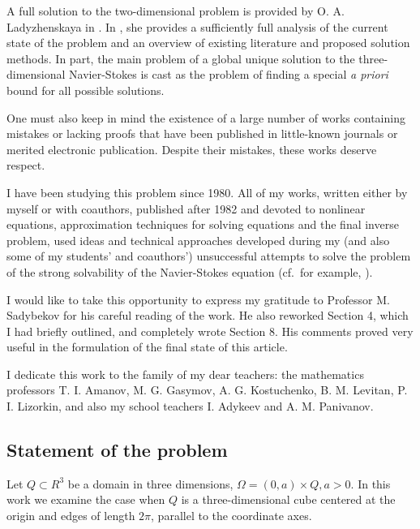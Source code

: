 \documentclass{article}
\numberwithin{equation}{section}
\begin{document}
A full solution to the two-dimensional problem is provided by O. A.
Ladyzhenskaya in \cite{lad1}. In \cite{lad4}, she provides a sufficiently full
analysis of the current state of the problem and an overview of existing
literature and proposed solution methods. In part, the main problem of a
global unique solution to the three-dimensional Navier-Stokes is cast as the
problem of finding a special \emph{a priori} bound for all possible solutions.

One must also keep in mind the existence of a large number of works containing
mistakes or lacking proofs that have been published in little-known journals
or merited electronic publication. Despite their  mistakes, these works
deserve respect.

I have been studying this problem since 1980. All of my works, written
either by myself or with coauthors, published after 1982 and devoted to
nonlinear equations, approximation techniques for solving equations and the
final inverse problem, used ideas and technical approaches developed during my
(and also some of my students' and coauthors') unsuccessful attempts to solve
the problem of the strong solvability of the Navier-Stokes equation (cf.\ for
example, 
\cite{ote1,ote2,ote3,ote4,ote5,ote6,ote7,ote8,ote9,ote10,ote11,ote12,ote13,ote14,ote15,ote16,ote17,ote18,ote19,ote20,ote21,ote22}).

I would like to take this opportunity to express my gratitude to Professor M.
Sadybekov for his careful reading of the work. He also reworked 
Section 4, which I had briefly outlined, and completely wrote Section 8. His
comments proved very useful in the formulation of the final state of this
article.

I dedicate this work to the family of my dear teachers: the mathematics
professors T. I. Amanov, M. G. Gasymov, A. G. Kostuchenko, B. M. Levitan, P.
I. Lizorkin, and also my school teachers I. Adykeev and A. M. Panivanov.

\subsection{Statement of the problem}
Let $Q \subset R^3$ be a domain in three dimensions, $\Omega = (0,a)\times Q,
a > 0$. In this work we examine the case when $Q$ is a three-dimensional cube
centered at the origin and edges of length $2\pi$, parallel to the coordinate axes.
\end{document}
